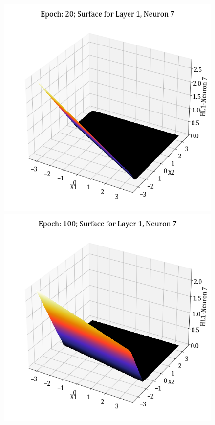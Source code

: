 \documentclass[11pt,a4paper]{article}
\begin{document}
\begin{figure}[H]
    \includegraphics[scale=0.4]{images/1B_MLFFNN_E20_HL1_N7.png}
    \includegraphics[scale=0.4]{images/1B_MLFFNN_E100_HL1_N7.png}

\end{figure}
\end{document}
